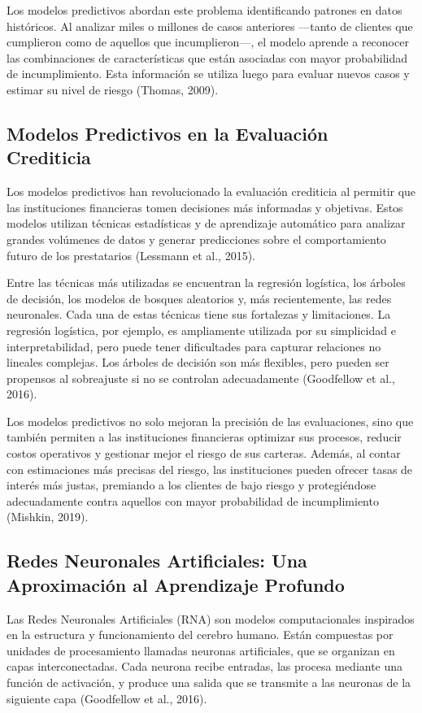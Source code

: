 \documentclass[12pt,a4paper]{article}
\begin{document}
Los modelos predictivos abordan este problema identificando patrones en datos históricos. Al analizar miles o millones de casos anteriores ---tanto de clientes que cumplieron como de aquellos que incumplieron---, el modelo aprende a reconocer las combinaciones de características que están asociadas con mayor probabilidad de incumplimiento. Esta información se utiliza luego para evaluar nuevos casos y estimar su nivel de riesgo (Thomas, 2009).

\subsection{Modelos Predictivos en la Evaluación Crediticia}

Los modelos predictivos han revolucionado la evaluación crediticia al permitir que las instituciones financieras tomen decisiones más informadas y objetivas. Estos modelos utilizan técnicas estadísticas y de aprendizaje automático para analizar grandes volúmenes de datos y generar predicciones sobre el comportamiento futuro de los prestatarios (Lessmann et al., 2015).

Entre las técnicas más utilizadas se encuentran la regresión logística, los árboles de decisión, los modelos de bosques aleatorios y, más recientemente, las redes neuronales. Cada una de estas técnicas tiene sus fortalezas y limitaciones. La regresión logística, por ejemplo, es ampliamente utilizada por su simplicidad e interpretabilidad, pero puede tener dificultades para capturar relaciones no lineales complejas. Los árboles de decisión son más flexibles, pero pueden ser propensos al sobreajuste si no se controlan adecuadamente (Goodfellow et al., 2016).

Los modelos predictivos no solo mejoran la precisión de las evaluaciones, sino que también permiten a las instituciones financieras optimizar sus procesos, reducir costos operativos y gestionar mejor el riesgo de sus carteras. Además, al contar con estimaciones más precisas del riesgo, las instituciones pueden ofrecer tasas de interés más justas, premiando a los clientes de bajo riesgo y protegiéndose adecuadamente contra aquellos con mayor probabilidad de incumplimiento (Mishkin, 2019).

\subsection{Redes Neuronales Artificiales: Una Aproximación al Aprendizaje Profundo}

Las Redes Neuronales Artificiales (RNA) son modelos computacionales inspirados en la estructura y funcionamiento del cerebro humano. Están compuestas por unidades de procesamiento llamadas neuronas artificiales, que se organizan en capas interconectadas. Cada neurona recibe entradas, las procesa mediante una función de activación, y produce una salida que se transmite a las neuronas de la siguiente capa (Goodfellow et al., 2016).
\end{document}
